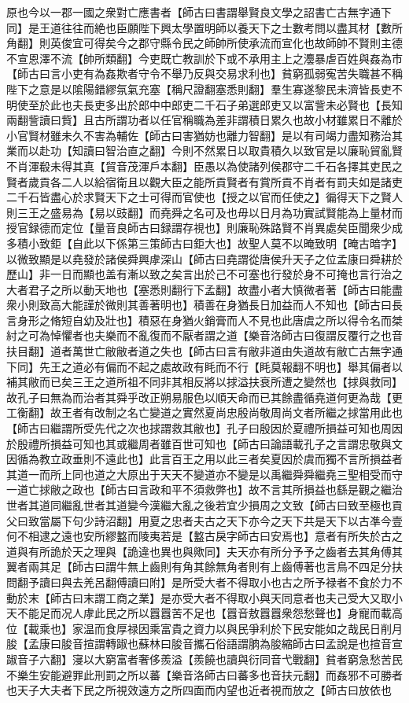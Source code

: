 原也今以一郡一國之衆對亡應書者【師古曰書謂舉賢良文學之詔書亡古無字通下同】是王道往往而絶也臣願陛下興太學置明師以養天下之士數考問以盡其材【數所角翻】則英俊宜可得矣今之郡守縣令民之師帥所使承流而宣化也故師帥不賢則主德不宣恩澤不流【帥所類翻】今吏既亡教訓於下或不承用主上之灋暴虐百姓與姦為市【師古曰言小吏有為姦欺者守令不舉乃反與交易求利也】貧窮孤弱寃苦失職甚不稱陛下之意是以隂陽錯繆氛氣充塞【稱尺證翻塞悉則翻】羣生寡遂黎民未濟皆長吏不明使至於此也夫長吏多出於郎中中郎吏二千石子弟選郎吏又以富訾未必賢也【長知兩翻訾讀曰貲】且古所謂功者以任官稱職為差非謂積日累久也故小材雖累日不離於小官賢材雖未久不害為輔佐【師古曰害猶妨也離力智翻】是以有司竭力盡知務治其業而以赴功【知讀曰智治直之翻】今則不然累日以取貴積久以致官是以廉恥貿亂賢不肖渾殽未得其真【貿音茂渾戶本翻】臣愚以為使諸列侯郡守二千石各擇其吏民之賢者歲貢各二人以給宿衛且以觀大臣之能所貢賢者有賞所貢不肖者有罰夫如是諸吏二千石皆盡心於求賢天下之士可得而官使也【授之以官而任使之】徧得天下之賢人則三王之盛易為【易以豉翻】而堯舜之名可及也毋以日月為功實試賢能為上量材而授官録德而定位【量音良師古曰録謂存視也】則廉恥殊路賢不肖異處矣臣聞衆少成多積小致鉅【自此以下係第三策師古曰鉅大也】故聖人莫不以晻致明【晻古暗字】以微致顯是以堯發於諸侯舜興虖深山【師古曰堯謂從唐侯升天子之位孟康曰舜耕於歷山】非一日而顯也盖有漸以致之矣言出於己不可塞也行發於身不可掩也言行治之大者君子之所以動天地也【塞悉則翻行下孟翻】故盡小者大慎微者著【師古曰能盡衆小則致高大能謹於微則其善著明也】積善在身猶長日加益而人不知也【師古曰長言身形之脩短自幼及壯也】積惡在身猶火銷膏而人不見也此唐虞之所以得令名而桀紂之可為悼懼者也夫樂而不亂復而不厭者謂之道【樂音洛師古曰復謂反覆行之也音扶目翻】道者萬世亡敝敝者道之失也【師古曰言有敝非道由失道故有敝亡古無字通下同】先王之道必有偏而不起之處故政有眊而不行【眊莫報翻不明也】舉其偏者以補其敝而已矣三王之道所祖不同非其相反將以捄溢扶衰所遭之變然也【捄與救同】故孔子曰無為而治者其舜乎改正朔易服色以順天命而已其餘盡循堯道何更為哉【更工衡翻】故王者有改制之名亡變道之實然夏尚忠殷尚敬周尚文者所繼之捄當用此也【師古曰繼謂所受先代之次也捄謂救其敝也】孔子曰殷因於夏禮所損益可知也周因於殷禮所損益可知也其或繼周者雖百世可知也【師古曰論語載孔子之言謂忠敬與文因循為教立政垂則不遠此也】此言百王之用以此三者矣夏因於虞而獨不言所損益者其道一而所上同也道之大原出于天天不變道亦不變是以禹繼舜舜繼堯三聖相受而守一道亡捄敝之政也【師古曰言政和平不須救弊也】故不言其所損益也繇是觀之繼治世者其道同繼亂世者其道變今漢繼大亂之後若宜少損周之文致【師古曰致至極也貢父曰致當屬下句少詩沼翻】用夏之忠者夫古之天下亦今之天下共是天下以古凖今壹何不相逮之遠也安所繆盭而陵夷若是【盭古戾字師古曰安焉也】意者有所失於古之道與有所詭於天之理與【詭違也異也與歟同】夫天亦有所分予予之齒者去其角傅其翼者兩其足【師古曰謂牛無上齒則有角其餘無角者則有上齒傅著也言鳥不四足分扶問翻予讀曰與去羌呂翻傅讀曰附】是所受大者不得取小也古之所予禄者不食於力不動於末【師古曰末謂工商之業】是亦受大者不得取小與天同意者也夫己受大又取小天不能足而况人虖此民之所以囂囂苦不足也【囂音敖囂囂衆怨愁聲也】身寵而載高位【載乘也】家温而食厚禄因乘富貴之資力以與民爭利於下民安能如之哉民日削月朘【孟康曰朘音揎謂轉踧也蘇林曰朘音攜石俗語謂朒為朘縮師古曰孟說是也揎音宣踧音子六翻】寖以大窮富者奢侈羨溢【羨饒也讀與衍同音弋戰翻】貧者窮急愁苦民不樂生安能避罪此刑罰之所以蕃【樂音洛師古曰蕃多也音扶元翻】而姦邪不可勝者也天子大夫者下民之所視效遠方之所四面而内望也近者視而放之【師古曰放依也